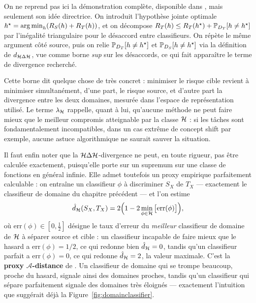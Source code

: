 \documentclass[11pt]{article}
\begin{document}
\begin{proofsketch}
On ne reprend pas ici la démonstration complète, disponible dans \citet{ben2010theory}, mais seulement
son idée directrice. On introduit l'hypothèse jointe optimale $h^\star = \argmin_{h}(R_S(h)+R_T(h))$, et
on décompose $R_T(h) \le R_T(h^\star) + \P_{D_T}[h\neq h^\star]$ par l'inégalité triangulaire pour le
désaccord entre classifieurs. On répète le même argument côté source, puis on relie $\P_{D_T}[h\neq
h^\star]$ et $\P_{D_S}[h\neq h^\star]$ via la définition de $\dHDelta$, vue comme borne \emph{sup} sur les
désaccords, ce qui fait apparaître le terme de divergence recherché.
\end{proofsketch}

Cette borne dit quelque chose de très concret : minimiser le risque cible revient à minimiser
simultanément, d'une part, le risque source, et d'autre part la divergence entre les deux domaines,
mesurée dans l'espace de représentation utilisé. Le terme $\lambda_\Hcal$ rappelle, quant à lui,
qu'aucune méthode ne peut faire mieux que le meilleur compromis atteignable par la classe $\Hcal$ : si
les tâches sont fondamentalement incompatibles, dans un cas extrême de concept shift par exemple, aucune
astuce algorithmique ne saurait sauver la situation.

Il faut enfin noter que la $\Hcal\Delta\Hcal$-divergence ne peut, en toute rigueur, pas être calculée
exactement, puisqu'elle porte sur un supremum sur une classe de fonctions en général infinie. Elle admet
toutefois un proxy empirique parfaitement calculable : on entraîne un classifieur $\phi$ à discriminer
$S_X$ de $T_X$ --- exactement le classifieur de domaine du chapitre précédent --- et l'on estime
\[
\hat d_\Hcal(S_X,T_X) = 2\Big(1 - 2\min_{\phi\in\Hcal}\big[\mathrm{err}(\phi)\big]\Big),
\]
où $\mathrm{err}(\phi)\in[0,\tfrac12]$ désigne le taux d'erreur du \emph{meilleur} classifieur de domaine
de $\Hcal$ à séparer source et cible : un classifieur incapable de faire mieux que le hasard a
$\mathrm{err}(\phi)=1/2$, ce qui redonne bien $\hat d_\Hcal=0$, tandis qu'un classifieur parfait a
$\mathrm{err}(\phi)=0$, ce qui redonne $\hat d_\Hcal=2$, la valeur maximale. C'est la \textbf{proxy
$\mathcal A$-distance} de \citet{ben2010theory}. Un classifieur de domaine qui se trompe beaucoup, proche
du hasard, signale ainsi des domaines proches, tandis qu'un classifieur qui sépare parfaitement signale
des domaines très éloignés --- exactement l'intuition que suggérait déjà la Figure~\ref{fig:domainclassifier}.
\end{document}
